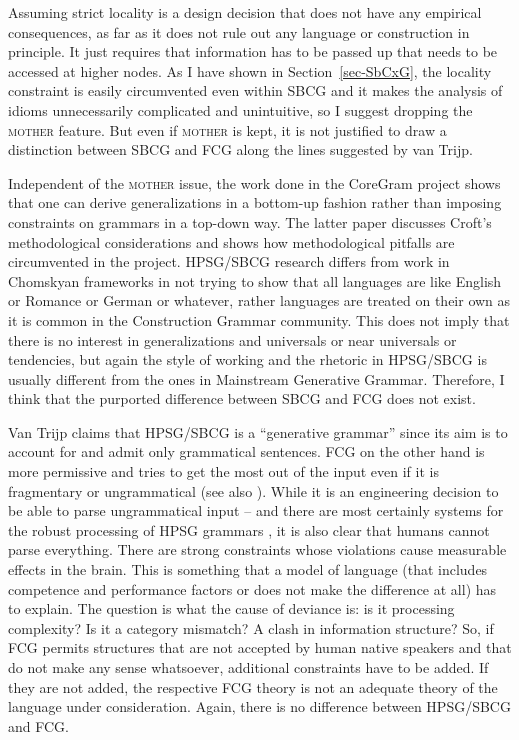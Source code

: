 Assuming strict locality is a design decision that does not have any empirical consequences, as far
as it does not rule out any language or construction in principle. It just requires that information
has to be passed up that needs to be accessed at higher nodes. As I have shown in Section~\ref{sec-SbCxG},
the locality constraint is easily circumvented even within SBCG and it makes the analysis of idioms
unnecessarily complicated and unintuitive, so I suggest dropping the \textsc{mother} feature. But even if \textsc{mother} is kept, it is not justified to draw a
distinction between SBCG and FCG along the lines suggested by van Trijp. 

Independent of the \textsc{mother} issue, the work done in the CoreGram project
\citep{MuellerCoreGramBrief,MuellerCoreGram} shows that one can derive generalizations in a
bottom-up fashion rather than imposing constraints on grammars in a top-down way. The latter paper
discusses Croft's methodological considerations and shows how methodological pitfalls are
circumvented in the project. HPSG/SBCG research differs from work in Chomskyan frameworks in not
trying to show that all languages are like English or Romance or German or whatever, rather
languages are treated on their own as it is common in the Construction Grammar community. This does
not imply that there is no interest in generalizations and universals or near universals or tendencies, but again
the style of working and the rhetoric in HPSG/SBCG is usually different from the ones in Mainstream
Generative Grammar. Therefore, I think that the purported difference
between SBCG and FCG does not exist.


Van Trijp claims that HPSG/SBCG is a ``generative grammar'' since its aim is to account for and admit only
grammatical sentences. FCG on the other hand is more permissive and tries to get the most out of the
input even if it is fragmentary or ungrammatical (see also \citealp[]{Steels2013a}). While it is an engineering decision to be able to parse ungrammatical input --  and 
 there are most certainly systems for the robust processing of HPSG grammars \citep*{KKN2000a-u,Copestake2007a-u}, it is also
clear that humans cannot parse everything. There are strong constraints whose violations cause measurable
effects in the brain. This is something that a model of language (that includes competence and
performance factors or does not make the difference at all) has to explain. The question is
what the cause of deviance is: is it processing complexity? Is it a category mismatch? A clash in
information structure? So, if FCG
permits structures that are not accepted by human native speakers and that do not make any sense
whatsoever, additional constraints have to be added. If they are not added, the respective FCG
theory is not an adequate theory of the language under consideration. Again, there is no difference
between HPSG/SBCG and FCG.  

